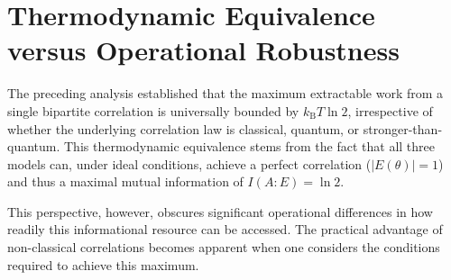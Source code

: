 \documentclass[%
  reprint,
  showpacs,
  showkeys,
  pra,
  longbibliography,
  floatfix,
  x11names
]{revtex4-2}
\begin{document}
\section{Thermodynamic Equivalence versus Operational Robustness}
\label{sec:advantages}
The preceding analysis established that the maximum extractable work from a single bipartite correlation is universally bounded by $k_{\mathrm{B}}T\ln 2$, irrespective of whether the underlying correlation law is classical, quantum, or stronger-than-quantum. This thermodynamic equivalence stems from the fact that all three models can, under ideal conditions, achieve a perfect correlation ($|E(\theta)|=1$) and thus a maximal mutual information of $I(A:E) = \ln 2$.

This perspective, however, obscures significant operational differences in how readily this informational resource can be accessed. The practical advantage of non-classical correlations becomes apparent when one considers the conditions required to achieve this maximum.
\end{document}
